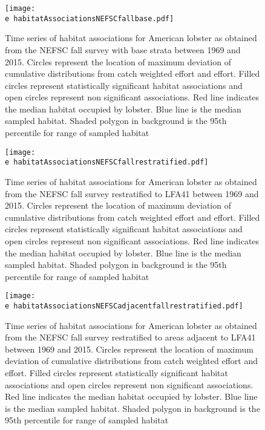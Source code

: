 \documentclass[11pt]{article}
\newcommand{\e}{/backup/bio_data/bio.lobster/figures/} %
\begin{document}


\begin{figure}

    \texttt{[image: \\e habitatAssociationsNEFSCfallbase.pdf]}
    \caption{Time series of habitat associations for American lobster as obtained from the NEFSC fall survey with base strata between 1969 and 2015. Circles represent the location of maximum deviation of cumulative distributions from catch weighted effort and effort. Filled circles represent statistically significant habitat associations and open circles represent non significant associations. Red line indicates
the median habitat occupied by lobster. Blue line is the median sampled habitat. Shaded polygon in background is the 95th percentile for range of sampled habitat}

\end{figure}



\begin{figure}

    \texttt{[image: \\e habitatAssociationsNEFSCfallrestratified.pdf]}
    \caption{Time series of habitat associations for American lobster as obtained from the NEFSC fall survey restratified to LFA41 between 1969 and 2015. Circles represent the location of maximum deviation of cumulative distributions from catch weighted effort and effort. Filled circles represent statistically significant habitat associations and open circles represent non significant associations. Red line indicates
the median habitat occupied by lobster. Blue line is the median sampled habitat. Shaded polygon in background is the 95th percentile for range of sampled habitat}

\end{figure}



\begin{figure}

    \texttt{[image: \\e habitatAssociationsNEFSCadjacentfallrestratified.pdf]}
    \caption{Time series of habitat associations for American lobster as obtained from the NEFSC fall survey  restratified to areas adjacent to LFA41 between 1969 and 2015. Circles represent the location of maximum deviation of cumulative distributions from catch weighted effort and effort. Filled circles represent statistically significant habitat associations and open circles represent non significant associations. Red line indicates
the median habitat occupied by lobster. Blue line is the median sampled habitat. Shaded polygon in background is the 95th percentile for range of sampled habitat}

\end{figure}
\end{document}

